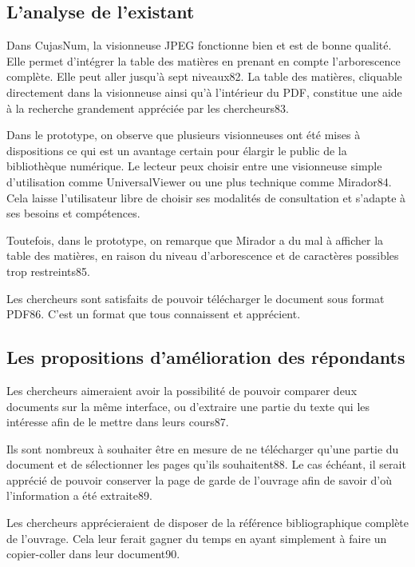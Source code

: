 \subsection{L’analyse de l’existant}

Dans CujasNum, la visionneuse JPEG fonctionne bien et est de bonne qualité. Elle permet d’intégrer la table des matières en prenant en compte l’arborescence complète. Elle peut aller jusqu’à sept niveaux82. La table des matières, cliquable directement dans la visionneuse ainsi qu’à l’intérieur du PDF, constitue une aide à la recherche grandement appréciée par les chercheurs83. 

Dans le prototype, on observe que plusieurs visionneuses ont été mises à dispositions ce qui est un avantage certain pour élargir le public de la bibliothèque numérique. Le lecteur peux choisir entre une visionneuse simple d’utilisation comme UniversalViewer ou une plus technique comme Mirador84. Cela laisse l’utilisateur libre de choisir ses modalités de consultation et s’adapte à ses besoins et compétences.  

Toutefois, dans le prototype, on remarque que Mirador a du mal à afficher la table des matières, en raison du niveau d’arborescence et de caractères possibles trop restreints85. 

Les chercheurs sont satisfaits de pouvoir télécharger le document sous format PDF86. C’est un format que tous connaissent et apprécient. 

\subsection{Les propositions d’amélioration des répondants}

Les chercheurs aimeraient avoir la possibilité de pouvoir comparer deux documents sur la même interface, ou d’extraire une partie du texte qui les intéresse afin de le mettre dans leurs cours87.  

Ils sont nombreux à souhaiter être en mesure de ne télécharger qu’une partie du document et de sélectionner les pages qu’ils souhaitent88. Le cas échéant, il serait apprécié de pouvoir conserver la page de garde de l’ouvrage afin de savoir d’où l’information a été extraite89.  

Les chercheurs apprécieraient de disposer de la référence bibliographique complète de l’ouvrage. Cela leur ferait gagner du temps en ayant simplement à faire un copier-coller dans leur document90. 



